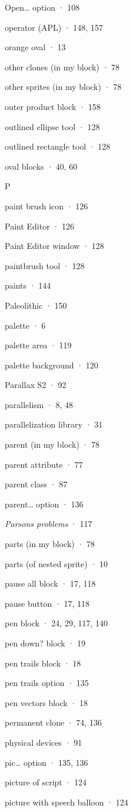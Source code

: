 \documentclass[
  letterpaper,
]{book}
\begin{document}
Open\ldots{} option · 108

operator (APL) · 148, 157

orange oval · 13

other clones (in my block) · 78

other sprites (in my block) · 78

outer product block · 158

outlined ellipse tool · 128

outlined rectangle tool · 128

oval blocks · 40, 60

P

paint brush icon · 126

Paint Editor · 126

Paint Editor window · 128

paintbrush tool · 128

paints · 144

Paleolithic · 150

palette · 6

palette area · 119

palette background · 120

Parallax S2 · 92

parallelism · 8, 48

parallelization library · 31

parent (in my block) · 78

parent attribute · 77

parent class · 87

parent\ldots{} option · 136

\emph{Parsons problems} · 117

parts (in my block) · 78

parts (of nested sprite) · 10

pause all block · 17, 118

pause button · 17, 118

pen block · 24, 29, 117, 140

pen down? block · 19

pen trails block · 18

pen trails option · 135

pen vectors block · 18

permanent clone · 74, 136

physical devices · 91

pic\ldots{} option · 135, 136

picture of script · 124

picture with speech balloon · 124
\end{document}
